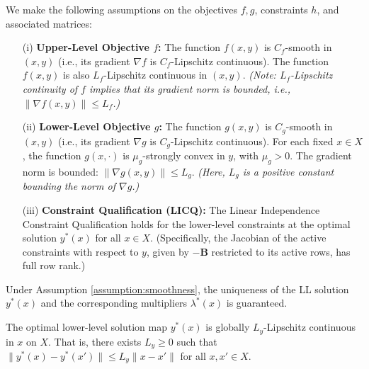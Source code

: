 \documentclass[letterpaper]{article} %
\newcommand{\1}{\mathbf{1}}
\begin{document}
\begin{assumption}\label{assumption:smoothness}
We make the following assumptions on the objectives $f, g$, constraints $h$, and associated matrices:
\begin{itemize}
    \item[(i)] \textbf{Upper-Level Objective $f$:}
    The function $f(x,y)$ is $C_f$-smooth in $(x,y)$ (i.e., its gradient $\nabla f$ is $C_f$-Lipschitz continuous).
    The function $f(x,y)$ is also $L_f$-Lipschitz continuous in $(x,y)$.
    \textit{(Note: $L_f$-Lipschitz continuity of $f$ implies that its gradient norm is bounded, i.e., $\|\nabla f(x,y)\| \le L_f$.)}

    \item[(ii)] \textbf{Lower-Level Objective $g$:}
    The function $g(x,y)$ is $C_g$-smooth in $(x,y)$ (i.e., its gradient $\nabla g$ is $C_g$-Lipschitz continuous).
    For each fixed $x \in X$, the function $g(x,\cdot)$ is $\mu_g$-strongly convex in $y$, with $\mu_g > 0$.
    The gradient norm is bounded: $\|\nabla g(x,y)\| \le L_g$. \textit{(Here, $L_g$ is a positive constant bounding the norm of $\nabla g$.)}


    \item[(iii)] \textbf{Constraint Qualification (LICQ):}
    The Linear Independence Constraint Qualification holds for the lower-level constraints at the optimal solution $y^*(x)$ for all $x \in X$. (Specifically, the Jacobian of the active constraints with respect to $y$, given by $-\mathbf{B}$ restricted to its active rows, has full row rank.)
\end{itemize}
\end{assumption}
Under Assumption \ref{assumption:smoothness}, the uniqueness of the LL solution $y^*(x)$ and the corresponding multipliers $\lambda^*(x)$ is guaranteed.

\begin{assumption}\label{assumption:lipschitzness}
The optimal lower-level solution map $y^*(x)$ is globally $L_y$-Lipschitz continuous in $x$ on $X$. That is, there exists $L_y \geq 0$ such that $\|y^*(x) - y^*(x')\| \leq L_y \|x - x'\|$ for all $x, x' \in X$.
\end{assumption}
\end{document}
